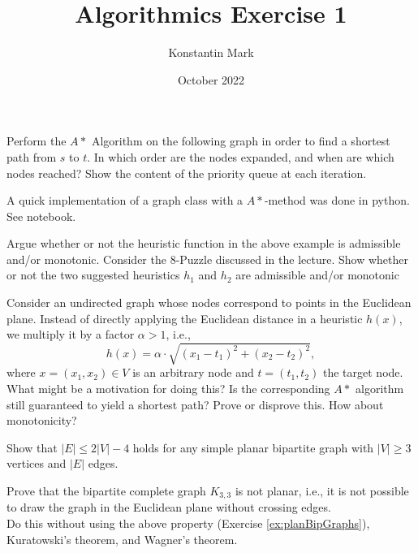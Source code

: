 \documentclass{article}
\title{Algorithmics Exercise 1}
\author{Konstantin Mark}
\date{October 2022}
\begin{document}
\maketitle

\begin{exercise}[$A*$ Algorithm]
    Perform the $A*$ Algorithm on the following graph in order to find a shortest path from $s$ to $t$. In which order are the nodes expanded, and when are which nodes reached? Show the content of the priority queue at each iteration.
\end{exercise}

\begin{solving}
    A quick implementation of a graph class with a $A*$-method was done in python. See notebook.
\end{solving}

\begin{exercise}
    Argue whether or not the heuristic function in the above example is admissible and/or monotonic. Consider the $8$-Puzzle discussed in the lecture. Show whether or not the two suggested heuristics $h_1$ and $h_2$ are admissible and/or monotonic
\end{exercise}

\begin{exercise}
    Consider an undirected graph whose nodes correspond to points in the Euclidean plane. Instead of directly applying the Euclidean distance in a heuristic $h(x)$, we multiply it by a factor $\alpha>1$, i.e.,
    \begin{equation*}
        h(x) = \alpha \cdot \sqrt{
            (x_1-t_1)^2+(x_2-t_2)^2
        },   
    \end{equation*}
    where $x= (x_1,x_2)\in V$ is an arbitrary node and $t= (t_1,t_2)$ the target node. What might be a motivation for doing this? Is the corresponding $A*$ algorithm still guaranteed to yield a shortest path? Prove or disprove this. How about monotonicity?
\end{exercise}

\begin{exercise}\label{ex:planBipGraphs}
    Show that $|E|\leq 2|V| - 4$ holds for any simple planar bipartite graph with $|V|\geq 3$ vertices and $|E|$ edges.
\end{exercise}

\begin{exercise}
    Prove that the bipartite complete graph $K_{3,3}$ is not planar, i.e., it is not possible to draw the graph in the Euclidean plane without crossing edges.\\
    Do this without using the above property (Exercise \ref{ex:planBipGraphs}), Kuratowski's theorem, and Wagner's theorem.
\end{exercise}
\end{document}
